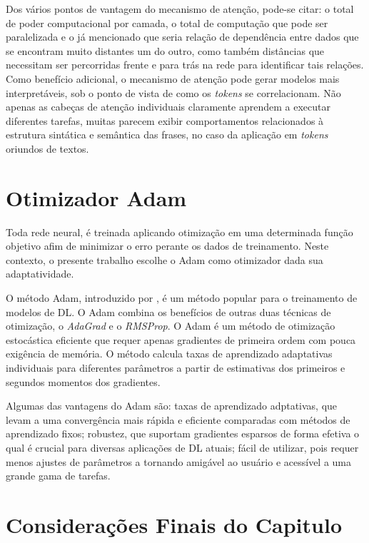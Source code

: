 Dos vários pontos de vantagem do mecanismo de atenção, pode-se citar: o total de poder computacional por camada, o total de computação que pode ser paralelizada e o já mencionado que seria relação de dependência entre dados que se encontram muito distantes um do outro, como também distâncias que necessitam ser percorridas frente e para trás na rede para identificar tais relações. Como benefício adicional, o mecanismo de atenção pode gerar modelos mais interpretáveis, sob o ponto de vista de como os \textit{tokens} se correlacionam. Não apenas as cabeças de atenção individuais claramente aprendem a executar diferentes tarefas, muitas parecem exibir comportamentos relacionados à estrutura sintática e semântica das frases, no caso da aplicação em \textit{tokens} oriundos de textos.

\section{Otimizador Adam}
\label{subsec:otimizadores_cap_3}

Toda rede neural, é treinada aplicando otimização em uma determinada função objetivo afim de minimizar o erro perante os dados de treinamento. Neste contexto, o presente trabalho escolhe o \gls{Adam} como otimizador dada sua adaptatividade.

O método \gls{Adam}, introduzido por \cite{kingmaAdamMethodStochastic2014}, é um método popular para o treinamento de modelos de \gls{DL}. O \gls{Adam} combina os benefícios de outras duas técnicas de otimização, o \textit{AdaGrad} e o \textit{RMSProp}. O \gls{Adam} é um método de otimização estocástica eficiente que requer apenas gradientes de primeira ordem com pouca exigência de memória. O método calcula taxas de aprendizado adaptativas individuais para diferentes parâmetros a partir de estimativas dos primeiros e segundos momentos dos gradientes.

Algumas das vantagens do \gls{Adam} são: taxas de aprendizado adptativas, que levam a uma convergência mais rápida e eficiente comparadas com métodos de aprendizado fixos; robustez, que suportam gradientes esparsos de forma efetiva o qual é crucial para diversas aplicações de \gls{DL} atuais; fácil de utilizar, pois requer menos ajustes de parâmetros a tornando amigável ao usuário e acessível a uma grande gama de tarefas.


\section{Considerações Finais do Capitulo}
\label{subsec:rcond_cap_3}

